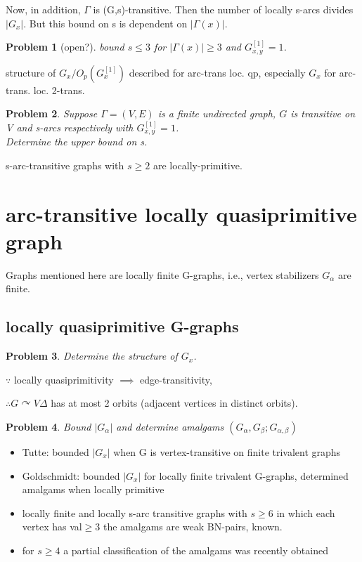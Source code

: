 \documentclass[a4paper,11pt,openany]{book}
\newtheorem{problem}{Problem}[section]
\begin{document}
Now, in addition, $\Gamma$ is (G,s)-transitive. Then the number of locally s-arcs divides $|G_x|$. But this bound on s is dependent on $|\Gamma(x)|$.

\begin{problem}[open?]
	bound $s\leq 3$ for $|\Gamma(x)|\geq 3$ and $G_{x,y}^{[1]}=1$.
\end{problem}


structure of $G_x/O_p(G_x^{[1]})$ described for arc-trans loc. qp, especially $G_x$ for arc-trans. loc. 2-trans.

\begin{problem}
	Suppose $\Gamma = (V, E)$ is a finite undirected graph, $G$ is transitive on V and s-arcs respectively with $G_{x,y}^{[1]}=1$.\\Determine the upper bound on s.
\end{problem}

s-arc-transitive graphs with $s\geq 2$ are locally-primitive.


\section{arc-transitive locally quasiprimitive graph}

Graphs mentioned here are locally finite G-graphs, i.e., vertex stabilizers $G_\alpha$ are finite.

\subsection{locally quasiprimitive G-graphs}
\begin{problem}
	Determine the structure of $G_x$.
\end{problem}

$\because$ locally quasiprimitivity $\implies$ edge-transitivity, 

$\therefore G\curvearrowright V\Delta$ has at most 2 orbits (adjacent vertices in distinct orbits).

\begin{problem}
	Bound $|G_\alpha|$ and determine amalgams $(G_\alpha,G_\beta;G_{\alpha,\beta})$
\end{problem}

\begin{itemize}
	\item Tutte: bounded $|G_x|$ when G is vertex-transitive on finite trivalent graphs
	\item Goldschmidt: bounded $|G_x|$ for locally finite trivalent G-graphs, determined amalgams when locally primitive
	\item locally finite and locally s-arc transitive graphs with $s\geq 6$ in which each vertex has val$\geq 3$ the amalgams are weak BN-pairs, known.
	\item for $s\geq 4$ a partial classification of the amalgams was recently obtained 
\end{itemize}
\end{document}
